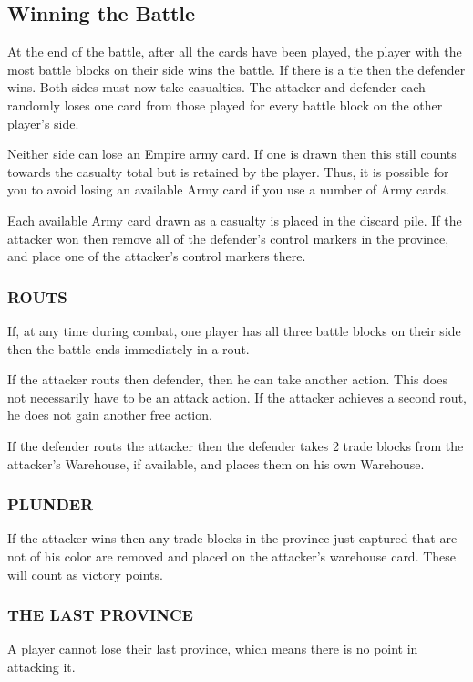 \subsection{Winning the Battle}

At the end of the battle, after all the cards have been played, the player with the most battle blocks on their side wins the battle. If there is a tie then the defender wins. Both sides must now take casualties. The attacker and defender each randomly loses one card from those played for every battle block on the other player’s side.

Neither side can lose an Empire army card. If one is drawn then this still counts towards the casualty total but is retained by the player. Thus, it is possible for you to avoid losing an available Army card if you use a number of Army cards.

Each available Army card drawn as a casualty is placed in the discard pile. If the attacker won then remove all of the defender’s control markers in the province, and place one of the attacker's control markers there.

\subsubsection{ROUTS}

If, at any time during combat, one player has all three battle blocks on their side then the battle ends immediately in a rout.

If the attacker routs then defender, then he can take another action. This does not necessarily have to be an attack action. If the attacker achieves a second rout, he does not gain another free action.

If the defender routs the attacker then the defender takes 2 trade blocks from the attacker’s Warehouse, if available, and places them on his own Warehouse.

\subsubsection{PLUNDER}

If the attacker wins then any trade blocks in the province just captured that are not of his color are removed and placed on the attacker’s warehouse card. These will count as victory points.

\subsubsection{THE LAST PROVINCE}

A player cannot lose their last province, which means there is no point in attacking it.
